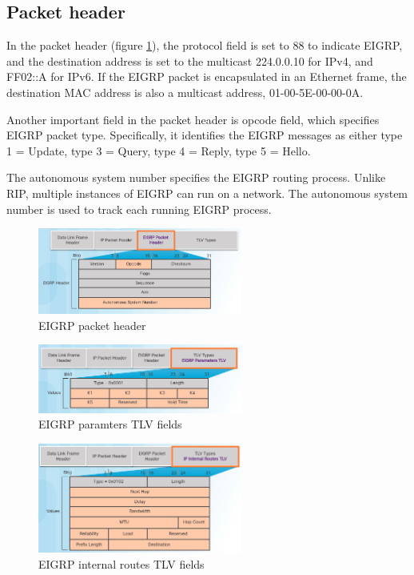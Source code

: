 \subsection{Packet header}
In the packet header (figure \ref{EIGRP-packet-header}), the protocol field is set to 88 to indicate EIGRP, and the destination address is set to the multicast 224.0.0.10 for IPv4, and FF02::A for IPv6. If the EIGRP packet is encapsulated in an Ethernet frame, the destination MAC address is also a multicast address, 01-00-5E-00-00-0A.\par 
Another important field in the packet header is opcode field, which specifies EIGRP packet type. Specifically, it identifies the EIGRP messages as either type 1 = Update, type 3 = Query, type 4 = Reply, type 5 = Hello. \par 
The autonomous system number specifies the EIGRP routing process. Unlike RIP, multiple instances of EIGRP can run on a network. The autonomous system number is used to track each running EIGRP process.\par 
\begin{figure}[hbtp]
\centering
\includegraphics[width=0.6\textwidth]{pictures/EIGRP-packet-header.png}
\caption{EIGRP packet header} \label{EIGRP-packet-header}
\end{figure}
\begin{figure}[hbtp]
\centering
\includegraphics[width=0.6\textwidth]{pictures/EIGRP-parameters.png}
\caption{EIGRP paramters TLV fields} \label{EIGRP-parameters}
\end{figure}
\begin{figure}[hbtp]
\centering
\includegraphics[width=0.6\textwidth]{pictures/EIGRP-internal-route.png}
\caption{EIGRP internal routes TLV fields} \label{EIGRP-internal-route}
\end{figure}

